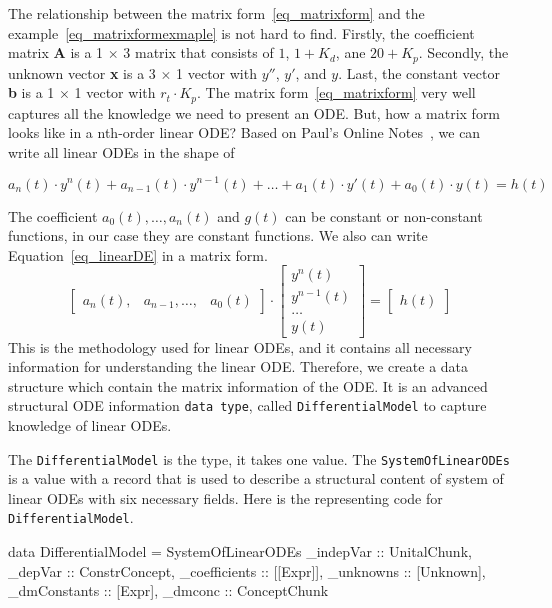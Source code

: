The relationship between the matrix form~\ref{eq_matrixform} and the example~\ref{eq_matrixformexmaple} is not hard to find. Firstly, the coefficient matrix \textbf{A} is a 1 $\times$ 3 matrix that consists of $1$, $1 + K_d$, ane $20 + K_p$. Secondly, the unknown vector \textbf{x} is a 3 $\times$ 1 vector with $y''$, $y'$, and $y$. Last, the constant vector \textbf{b} is a 1 $\times$ 1 vector with $r_t \cdot K_p$. The matrix form~\ref{eq_matrixform} very well captures all the knowledge we need to present an ODE. But, how a matrix form looks like in a nth-order linear ODE? Based on Paul's Online Notes~\citep{paullinearode}, we can write all linear ODEs in the shape of

\begin{equation} \label{eq_linearDE}
	a_n(t) \cdot y^n(t) + a_{n-1}(t) \cdot y^{n-1}(t) + \dots + a_1(t) \cdot y'(t) + a_0(t) \cdot y(t) = h(t)
\end{equation}

The coefficient $a_0(t), \dots, a_n(t)$ and $g(t)$ can be constant or non-constant functions, in our case they are constant functions. We also can write Equation~\ref{eq_linearDE} in a matrix form. 
\begin{equation} \label{eq_matrixnthorder}
	\begin{bmatrix}
		a_n(t), & a_{n-1}, \dots, & a_0(t)
	\end{bmatrix}
	\cdot
	\begin{bmatrix}
		y^{n}(t) \\
		y^{n-1}(t) \\
		\dots \\
		y(t)  
	\end{bmatrix}
	=
	\begin{bmatrix}
		h(t)
	\end{bmatrix}
\end{equation}
This is the methodology used for linear ODEs, and it contains all necessary information for understanding the linear ODE. Therefore, we create a data structure which contain the matrix information of the ODE. It is an advanced structural ODE information \verb|data type|, called \verb|DifferentialModel| to capture knowledge of linear ODEs.

The \verb|DifferentialModel| is the type, it takes one value. The \verb|SystemOfLinearODEs| is a value with a record that is used to describe a structural content of system of linear ODEs with six necessary fields. Here is the representing code for \verb|DifferentialModel|.
\begin{haskell1}
data DifferentialModel = SystemOfLinearODEs {
	_indepVar :: UnitalChunk,
	_depVar :: ConstrConcept,
	_coefficients :: [[Expr]],
	_unknowns :: [Unknown],
	_dmConstants :: [Expr],
	_dmconc :: ConceptChunk
}
\end{haskell1}

